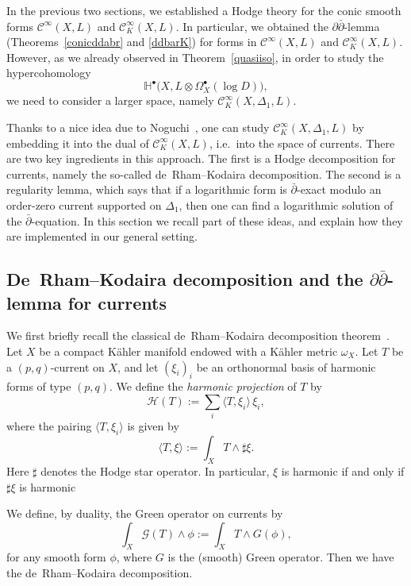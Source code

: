 \documentclass[english]{amsart}
\newcommand{\ddbar}{\partial\bar{\partial}}
\newcommand{\cH}{\mathcal{H}}
\newcommand{\cG}{\mathcal{G}}
\newcommand{\dbar}{\bar \partial}
\numberwithin{equation}{thm}
\begin{document}
In the previous two sections, we established a Hodge theory for the conic smooth forms $\mathcal{C}^\infty(X,L)$ and $\mathcal{C}^\infty_K(X,L)$. In particular, we obtained the $\ddbar$-lemma (Theorems~\ref{conicddabr} and \ref{ddbarK}) for forms in $\mathcal{C}^\infty(X,L)$ and $\mathcal{C}^\infty_K(X,L)$. However, as we already observed in Theorem~\ref{quasiiso}, in order to study the hypercohomology
\[
\mathbb{H}^\bullet\bigl(X, L \otimes \Omega_X^\bullet(\log D)\bigr),
\]
we need to consider a larger space, namely $\mathcal{C}^\infty_K(X,\Delta_1,L)$.

Thanks to a nice idea due to Noguchi~\cite{Nog95}, one can study $\mathcal{C}^\infty_K(X,\Delta_1,L)$ by embedding it into the dual of $\mathcal{C}^\infty_K(X,L)$, i.e.\ into the space of currents. There are two key ingredients in this approach. The first is a Hodge decomposition for currents, namely the so-called de~Rham--Kodaira decomposition. The second is a regularity lemma, which says that if a logarithmic form is $\dbar$-exact modulo an order-zero current supported on $\Delta_1$, then one can find a logarithmic solution of the $\dbar$-equation. 
In this section we recall part of these ideas, and explain how they are implemented in our general setting.
\bigskip

\subsection{De~Rham--Kodaira decomposition and the $\ddbar$-lemma for currents}

We first briefly recall the classical de~Rham--Kodaira decomposition theorem~\cite{dRKo}.
Let $X$ be a compact K\"ahler manifold endowed with a K\"ahler metric $\omega_X$.
Let $T$ be a $(p,q)$-current on $X$, and let $(\xi_i)_i$ be an orthonormal basis of harmonic forms of type $(p,q)$.
We define the \emph{harmonic projection} of $T$ by
\begin{equation}\label{projH}
	\cH(T):=\sum_i \langle T,\xi_i\rangle\, \xi_i,
\end{equation}
where the pairing $\langle T,\xi_i\rangle$ is given by
\begin{equation}\label{pave72}
	\langle T,\xi\rangle := \int_X T\wedge \sharp \xi.
\end{equation}
Here $\sharp$ denotes the Hodge star operator. In particular, $\xi$ is harmonic if and only if $\sharp \xi$ is harmonic \cite[Chapter VI, (3.18 )]{bookJP}

\bigskip

We define, by duality, the Green operator on currents by
\begin{equation}\label{pave17}
	\int_X \cG(T)\wedge \phi := \int_X T\wedge G(\phi),
\end{equation}
for any smooth form $\phi$, where $G$ is the (smooth) Green operator. Then we have the de~Rham--Kodaira decomposition.
\end{document}
